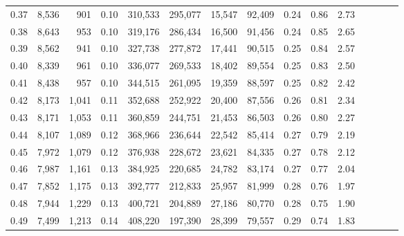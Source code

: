 \begin{tabular}{rrrcrrrrrrrrrrr}
0.37 &  8,536 &    901 &                                       0.10 &  310,533 &  295,077 &   15,547 &   92,409 &  0.24 &  0.86 &                         2.73 \\
0.38 &  8,643 &    953 &                                       0.10 &  319,176 &  286,434 &   16,500 &   91,456 &  0.24 &  0.85 &                         2.65 \\
0.39 &  8,562 &    941 &                                       0.10 &  327,738 &  277,872 &   17,441 &   90,515 &  0.25 &  0.84 &                         2.57 \\
0.40 &  8,339 &    961 &                                       0.10 &  336,077 &  269,533 &   18,402 &   89,554 &  0.25 &  0.83 &                         2.50 \\
0.41 &  8,438 &    957 &                                       0.10 &  344,515 &  261,095 &   19,359 &   88,597 &  0.25 &  0.82 &                         2.42 \\
0.42 &  8,173 &  1,041 &                                       0.11 &  352,688 &  252,922 &   20,400 &   87,556 &  0.26 &  0.81 &                         2.34 \\
0.43 &  8,171 &  1,053 &                                       0.11 &  360,859 &  244,751 &   21,453 &   86,503 &  0.26 &  0.80 &                         2.27 \\
0.44 &  8,107 &  1,089 &                                       0.12 &  368,966 &  236,644 &   22,542 &   85,414 &  0.27 &  0.79 &                         2.19 \\
0.45 &  7,972 &  1,079 &                                       0.12 &  376,938 &  228,672 &   23,621 &   84,335 &  0.27 &  0.78 &                         2.12 \\
0.46 &  7,987 &  1,161 &                                       0.13 &  384,925 &  220,685 &   24,782 &   83,174 &  0.27 &  0.77 &                         2.04 \\
0.47 &  7,852 &  1,175 &                                       0.13 &  392,777 &  212,833 &   25,957 &   81,999 &  0.28 &  0.76 &                         1.97 \\
0.48 &  7,944 &  1,229 &                                       0.13 &  400,721 &  204,889 &   27,186 &   80,770 &  0.28 &  0.75 &                         1.90 \\
0.49 &  7,499 &  1,213 &                                       0.14 &  408,220 &  197,390 &   28,399 &   79,557 &  0.29 &  0.74 &                         1.83 \\

\end{tabular}
